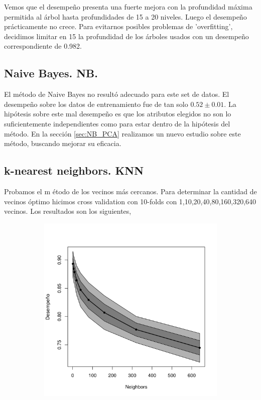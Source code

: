 \documentclass[a4paper,10pt]{article}
\begin{document}
Vemos que el desempeño presenta una fuerte mejora con la profundidad máxima 
permitida al árbol hasta profundidades de 15 a 20 niveles. Luego el desempeño 
prácticamente no crece. Para evitarnos posibles problemas de 'overfitting', 
decidimos limitar en 15 la profundidad de los árboles usados con un desempeño 
correspondiente de 0.982.

\subsection{Naive Bayes. NB.}\label{sec:NB}

El m\'etodo de Naive Bayes no result\'o adecuado para este set de datos. El desempeño sobre los datos de entrenamiento fue de tan solo $0.52 \pm 0.01$. 
La hipótesis sobre este mal desempeño es que los atributos elegidos no son lo
suficientemente independientes como para estar dentro de la hipótesis del
método. En la sección \ref{sec:NB_PCA} realizamos un nuevo estudio 
sobre este método, buscando mejorar su eficacia.

\subsection{k-nearest neighbors. KNN}

Probamos el m \'etodo de los vecinos m\'as cercanos. Para determinar la cantidad de vecinos \'optimo hicimos cross validation con 10-folds con 1,10,20,40,80,160,320,640 vecinos. Los resultados son los siguientes, 

\begin{figure}[H]
  \centering
  \begin{subfigure}[b]{0.4\textwidth}
    \includegraphics[width=\textwidth]{../imagenes/knn-n_neighbors}
     \caption{}
  \end{subfigure}
  \label{fig:knn-n_neighbors}
\end{figure}
\end{document}

